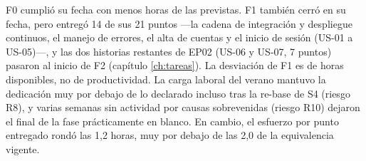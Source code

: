 F0 cumplió su fecha con menos horas de las previstas.
F1 también cerró en su fecha, pero entregó 14 de sus 21 puntos —la cadena de integración y despliegue continuos, el manejo de errores, el alta de cuentas y el inicio de sesión (US-01 a US-05)—, y las dos historias restantes de EP02 (US-06 y US-07, 7 puntos) pasaron al inicio de F2 (capítulo \ref{ch:tareas}).
La desviación de F1 es de horas disponibles, no de productividad.
La carga laboral del verano mantuvo la dedicación muy por debajo de lo declarado incluso tras la re-base de S4 (riesgo R8), y varias semanas sin actividad por causas sobrevenidas (riesgo R10) dejaron el final de la fase prácticamente en blanco.
En cambio, el esfuerzo por punto entregado rondó las 1,2 horas, muy por debajo de las 2,0 de la equivalencia vigente.
